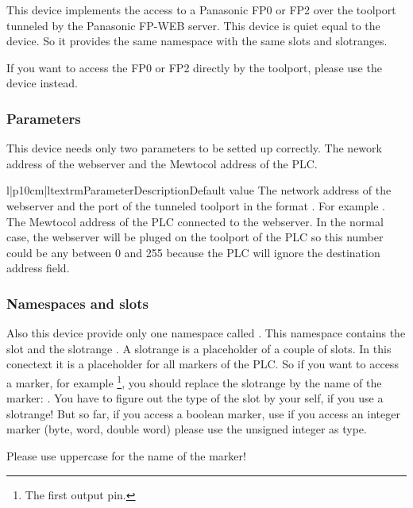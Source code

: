 This device implements the access to a Panasonic FP0 or FP2 over the toolport 
tunneled by the Panasonic FP-WEB server. This device is quiet equal to the
 device. So it provides the same namespace with
the same slots and slotranges.

If you want to access the FP0 or FP2 directly by the toolport, please use
the  device instead.

\subsubsection{Parameters}
This device needs only two parameters to be setted up correctly. The nework
address of the webserver and the Mewtocol address of the PLC.
\begin{tableiii}{l|p{10cm}|l}{textrm}{Parameter}{Description}{Default value}
        {The network address of the webserver and the port of the tunneled
        toolport in the format . For example 
        .}
        {}
        {The Mewtocol address of the PLC connected to the webserver. In
        the normal case, the webserver will be pluged on the toolport
        of the PLC so this number could be any between 0 and 255 because
        the PLC will ignore the destination address field.}
        {}
\end{tableiii}

\subsubsection{Namespaces and slots}
Also this device provide only one namespace called . This 
namespace contains the slot  and the slotrange . A 
slotrange is a placeholder of a couple of slots. In this conectext it is a
placeholder for all markers of the PLC. So if you want to access a marker,
for example \footnote{The first output pin.}, you should replace
the slotrange by the name of the marker: . 
You have to figure out the type of the slot by your self, if you use
a slotrange! But so far, if you access a boolean marker, use 
if you access an integer marker (byte, word, double word) please use 
the unsigned integer  as type.
\begin{notice}
Please use uppercase for the name of the marker!
\end{notice}

